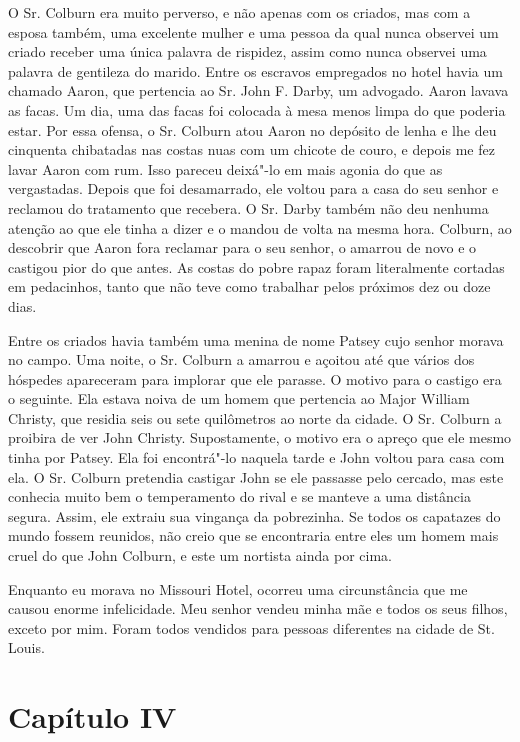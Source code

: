 O Sr. Colburn era muito perverso, e não apenas com os criados, mas com a
esposa também, uma excelente mulher e uma pessoa da qual nunca observei
um criado receber uma única palavra de rispidez, assim como nunca
observei uma palavra de gentileza do marido. Entre os escravos
empregados no hotel havia um chamado Aaron, que pertencia ao Sr. John F.
Darby, um advogado. Aaron lavava as facas. Um dia, uma das facas foi
colocada à mesa menos limpa do que poderia estar. Por essa ofensa, o Sr.
Colburn atou Aaron no depósito de lenha e lhe deu cinquenta chibatadas
nas costas nuas com um chicote de couro, e depois me fez lavar Aaron com
rum. Isso pareceu deixá"-lo em mais agonia do que as vergastadas. Depois
que foi desamarrado, ele voltou para a casa do seu senhor e reclamou do
tratamento que recebera. O Sr. Darby também não deu nenhuma atenção ao
que ele tinha a dizer e o mandou de volta na mesma hora. Colburn, ao
descobrir que Aaron fora reclamar para o seu senhor, o amarrou de novo e
o castigou pior do que antes. As costas do pobre rapaz foram
literalmente cortadas em pedacinhos, tanto que não teve como trabalhar
pelos próximos dez ou doze dias.

Entre os criados havia também uma menina de nome Patsey cujo senhor
morava no campo. Uma noite, o Sr. Colburn a amarrou e açoitou até que
vários dos hóspedes apareceram para implorar que ele parasse. O motivo
para o castigo era o seguinte. Ela estava noiva de um homem que
pertencia ao Major William Christy, que residia seis ou sete quilômetros
ao norte da cidade. O Sr. Colburn a proibira de ver John Christy.
Supostamente, o motivo era o apreço que ele mesmo tinha por Patsey. Ela
foi encontrá"-lo naquela tarde e John voltou para casa com ela. O Sr.
Colburn pretendia castigar John se ele passasse pelo cercado, mas este
conhecia muito bem o temperamento do rival e se manteve a uma distância
segura. Assim, ele extraiu sua vingança da pobrezinha. Se todos os
capatazes do mundo fossem reunidos, não creio que se encontraria entre
eles um homem mais cruel do que John Colburn, e este um nortista ainda
por cima.

Enquanto eu morava no Missouri Hotel, ocorreu uma circunstância que me
causou enorme infelicidade. Meu senhor vendeu minha mãe e todos os seus
filhos, exceto por mim. Foram todos vendidos para pessoas diferentes na
cidade de St. Louis.

\chapter{Capítulo IV}

